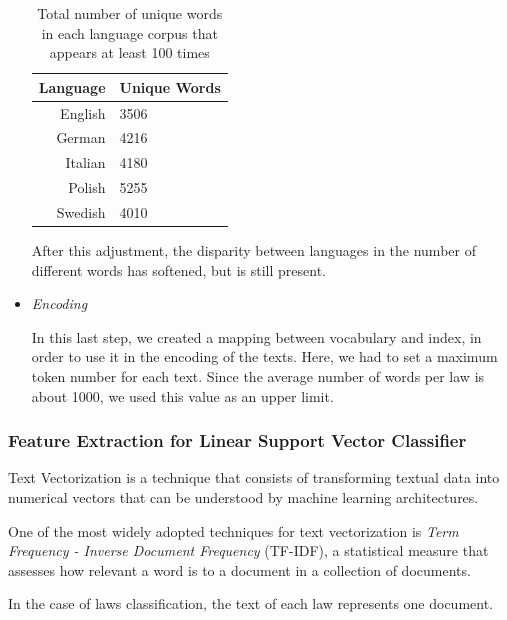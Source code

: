 \documentclass[letterpaper,11pt]{article}
\begin{document}
\begin{itemize}
  \begin{table}[H]
    \centering
    \begin{tabular}{@{}rl@{}}
    \toprule
    \multicolumn{1}{c}{\textbf{Language}} & \textbf{Unique Words} \\ \midrule
    English                               & 3506                   \\
    German                                & 4216                   \\
    Italian                               & 4180                   \\
    Polish                                & 5255                   \\
    Swedish                               & 4010                   \\ \bottomrule
    \end{tabular}
    \caption{Total number of unique words in each language corpus that appears at least 100 times}
    \label{table:tot_words_for_corpuses_only_common}
    \end{table}

  After this adjustment, the disparity between languages in the number of different words has softened, but is still present.

  \item \textit{Encoding}
  
  In this last step, we created a mapping between vocabulary and index, in order to use it in the encoding of the texts. Here, we had to set a maximum token number for each text. Since the average number of words per law is about 1000, we used this value as an upper limit.


\end{itemize}


\subsubsection*{Feature Extraction for Linear Support Vector Classifier}

Text Vectorization is a technique that consists of transforming textual data into numerical vectors that can be understood by machine learning architectures.

One of the most widely adopted techniques for text vectorization is \textit{Term Frequency - Inverse Document Frequency} (TF-IDF), a statistical measure that assesses how relevant a word is to a document in a collection of documents.

In the case of laws classification, the text of each law represents one document.
\end{document}
